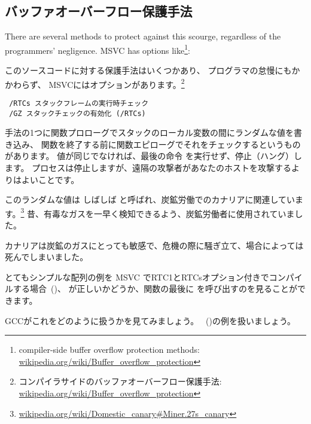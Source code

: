 ﻿\subsection{バッファオーバーフロー保護手法}
\label{subsec:BO_protection}

There are several methods to protect against this scourge, regardless of the \CCpp programmers' negligence.
MSVC has options like\footnote{compiler-side buffer overflow protection methods:
\href{http://go.yurichev.com/17133}{wikipedia.org/wiki/Buffer\_overflow\_protection}}:

このソースコードに対する保護手法はいくつかあり、 \CCpp プログラマの怠慢にもかかわらず、
MSVCにはオプションがあります。\footnote{コンパイラサイドのバッファオーバーフロー保護手法:
\href{http://go.yurichev.com/17133}{wikipedia.org/wiki/Buffer\_overflow\_protection}}

\begin{lstlisting}
 /RTCs スタックフレームの実行時チェック
 /GZ スタックチェックの有効化 (/RTCs)
\end{lstlisting}


手法の1つに関数プロローグでスタックのローカル変数の間にランダムな値を書き込み、
関数を終了する前に関数エピローグでそれをチェックするというものがあります。
値が同じでなければ、最後の命令 \RET を実行せず、停止（ハング）します。
プロセスは停止しますが、遠隔の攻撃者があなたのホストを攻撃するよりはよいことです。

\newcommand{\CANARYURL}{\href{http://go.yurichev.com/17134}{wikipedia.org/wiki/Domestic\_canary\#Miner.27s\_canary}}


このランダムな値は しばしば  と呼ばれ、炭鉱労働でのカナリアに関連しています。\footnote{\CANARYURL}
昔、有毒なガスを一早く検知できるよう、炭鉱労働者に使用されていました。

カナリアは炭鉱のガスにとっても敏感で、危機の際に騒ぎ立て、場合によっては死んでしまいました。

とてもシンプルな配列の例を \ac{MSVC} でRTC1とRTCsオプション付きでコンパイルする場合~()、
が正しいかどうか、関数の最後に  を呼び出すのを見ることができます。

GCCがこれをどのように扱うかを見てみましょう。
~()の例を扱いましょう。



